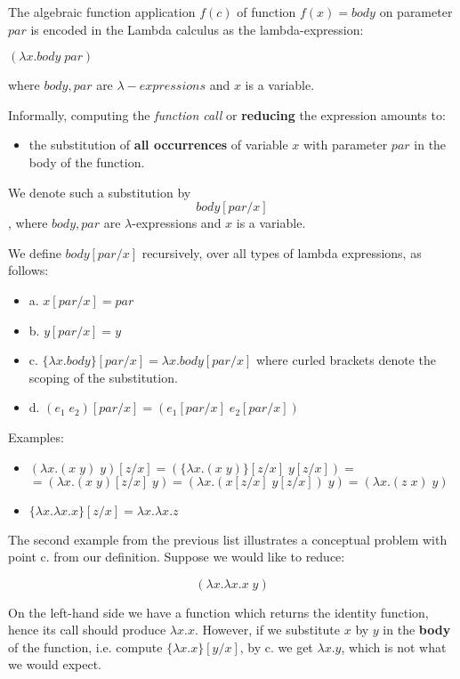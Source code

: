 The algebraic function application $f(c)$ of function $f(x)=body$ on parameter $par$ is encoded in the Lambda calculus as the lambda-expression:

$(\lambda x.body\; par)$

where $body,par$ are $\lambda-expressions$ and $x$ is a variable.

Informally, computing the \textit{function call} or \textbf{reducing} the expression amounts to:
\begin{itemize}
	\item  the substitution of \textbf{all occurrences} of variable $x$ with parameter $par$ in the body of the function.
\end{itemize}

We denote such a substitution by $$ body[par / x]$$, where $body,par$ are $\lambda$-expressions and $x$ is a variable.

We define $ body[par / x]$ recursively, over all types of lambda expressions, as follows:
\begin{itemize}
	\item  a. $ x[par/x] = par$
	\item  b. $ y[par/x] = y$
	\item  c. $ \{\lambda x.body\}[par/x] = \lambda x.body[par/x]$ where curled brackets denote the scoping of the substitution.
	\item  d. $ (e_1\;e_2)[par/x] = (e_1[par/x]\;e_2[par/x])$ 
\end{itemize}

Examples:
\begin{itemize}
	\item  $ (\lambda x.(x\;y)\;y)[z/x] = (\{\lambda x.(x\;y)\}[z/x]\; y[z/x])=$\\$ = (\lambda x.(x\;y)[z/x]\;y) = (\lambda x.(x[z/x]\;y[z/x])\;y)=(\lambda x.(z\;x)\;y)$
	\item  $ \{\lambda x.\lambda x.x\}[z/x] = \lambda x.\lambda x.z $
\end{itemize}

The second example from the previous list illustrates a conceptual problem with point c. from our definition. Suppose we would like to reduce:

$$ (\lambda x.\lambda x.x\; y)$$

On the left-hand side we have a function which returns the identity function, hence its call should produce $\lambda x.x$. However, if we substitute $x$ by $y$ in the \textbf{body} of the function, i.e. compute $ \{\lambda x.x\}[y/x]$, by c. we get $\lambda x.y$, which is not what we would expect.

